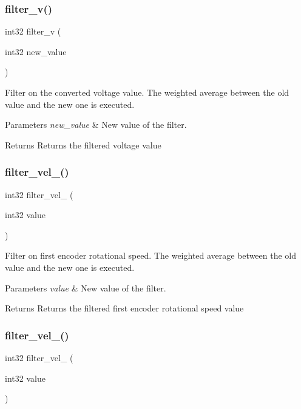 \subsubsection{filter\+\_\+v()}
{\footnotesize\ttfamily int32 filter\+\_\+v (\begin{DoxyParamCaption}\item[{int32}]{new\+\_\+value }\end{DoxyParamCaption})}

Filter on the converted voltage value. The weighted average between the old value and the new one is executed.


\begin{DoxyParams}{Parameters}
{\em new\+\_\+value} & New value of the filter.\\
\hline
\end{DoxyParams}
\begin{DoxyReturn}{Returns}
Returns the filtered voltage value 
\end{DoxyReturn}
\mbox{\label{utils_8c_a19d6395ebc48dcac09068a5c6eb19596}} 
\subsubsection{filter\+\_\+vel\+\_()}
{\footnotesize\ttfamily int32 filter\+\_\+vel\+\_ (\begin{DoxyParamCaption}\item[{int32}]{value }\end{DoxyParamCaption})}

Filter on first encoder rotational speed. The weighted average between the old value and the new one is executed.


\begin{DoxyParams}{Parameters}
{\em value} & New value of the filter.\\
\hline
\end{DoxyParams}
\begin{DoxyReturn}{Returns}
Returns the filtered first encoder rotational speed value 
\end{DoxyReturn}
\mbox{\label{utils_8c_aa24da14909e1e213a2d5f5522752f2c9}} 
\subsubsection{filter\+\_\+vel\+\_()}
{\footnotesize\ttfamily int32 filter\+\_\+vel\+\_ (\begin{DoxyParamCaption}\item[{int32}]{value }\end{DoxyParamCaption})}

